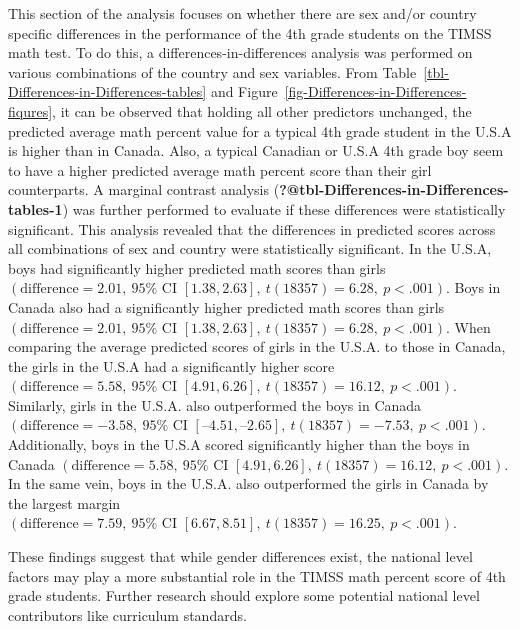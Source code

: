 \documentclass[
  letterpaper,
  DIV=11,
  numbers=noendperiod]{scrartcl}
\begin{document}
This section of the analysis focuses on whether there are sex and/or
country specific differences in the performance of the 4th grade
students on the TIMSS math test. To do this, a
differences-in-differences analysis was performed on various
combinations of the country and sex variables. From
Table~\ref{tbl-Differences-in-Differences-tables} and
Figure~\ref{fig-Differences-in-Differences-fiqures}, it can be observed
that holding all other predictors unchanged, the predicted average math
percent value for a typical 4th grade student in the U.S.A is higher
than in Canada. Also, a typical Canadian or U.S.A 4th grade boy seem to
have a higher predicted average math percent score than their girl
counterparts. A marginal contrast analysis
(\textbf{?@tbl-Differences-in-Differences-tables-1}) was further
performed to evaluate if these differences were statistically
significant. This analysis revealed that the differences in predicted
scores across all combinations of sex and country were statistically
significant. In the U.S.A, boys had significantly higher predicted math
scores than girls
\((\text{difference}= 2.01,\ 95\%  \text{ CI } [1.38, 2.63],\ t(18357) = 6.28,\ p < .001)\).
Boys in Canada also had a significantly higher predicted math scores
than
girls\((\text{difference}= 2.01,\ 95\%  \text{ CI } [1.38, 2.63],\ t(18357) = 6.28,\ p < .001)\).
When comparing the average predicted scores of girls in the U.S.A. to
those in Canada, the girls in the U.S.A had a significantly higher score
\((\text{difference}= 5.58,\ 95\%   \text{ CI } [4.91, 6.26],\ t(18357) = 16.12,\ p < .001)\).
Similarly, girls in the U.S.A. also outperformed the boys in Canada
\((\text{difference}= -3.58,\ 95\%   \text{ CI } [–4.51, –2.65],\ t(18357) = -7.53,\ p < .001)\).
Additionally, boys in the U.S.A scored significantly higher than the
boys in Canada
\((\text{difference}= 5.58,\ 95\%   \text{ CI } [4.91, 6.26],\ t(18357) = 16.12,\ p < .001)\).
In the same vein, boys in the U.S.A. also outperformed the girls in
Canada by the largest margin
\((\text{difference}= 7.59,\ 95\%   \text{ CI } [6.67, 8.51],\ t(18357) = 16.25,\ p < .001)\).

These findings suggest that while gender differences exist, the national
level factors may play a more substantial role in the TIMSS math percent
score of 4th grade students. Further research should explore some
potential national level contributors like curriculum standards.
\end{document}
